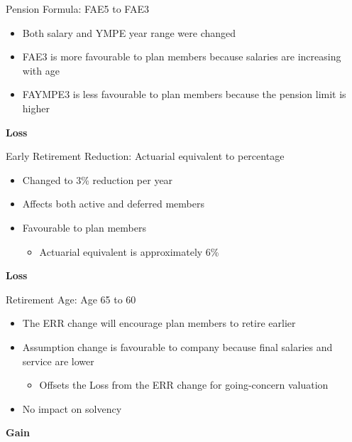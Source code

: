 \documentclass{beamer}
\begin{document}
\begin{frame}{Pension Formula: FAE5 to FAE3}

\begin{itemize}
\item Both salary and YMPE year range were changed
\item FAE3 is more favourable to plan members because salaries are increasing with age
\item FAYMPE3 is less favourable to plan members because the pension limit is higher
\end{itemize}

\medskip
\qquad\textbf{Loss}

\end{frame}

\begin{frame}{Early Retirement Reduction: Actuarial equivalent to percentage}

\begin{itemize}
\item Changed to 3\% reduction per year
\item Affects both active and deferred members
\item Favourable to plan members
\begin{itemize}
\item Actuarial equivalent is approximately 6\%
\end{itemize}
\end{itemize}

\medskip
\qquad\textbf{Loss}

\end{frame}

\begin{frame}{Retirement Age: Age 65 to 60}

\begin{itemize}
\item The ERR change will encourage plan members to retire earlier
\item Assumption change is favourable to company because final salaries and service are lower
\begin{itemize}
\item Offsets the Loss from the ERR change for going-concern valuation
\end{itemize}
\item No impact on solvency
\end{itemize}

\medskip
\qquad\textbf{Gain}

\end{frame}
\end{document}

